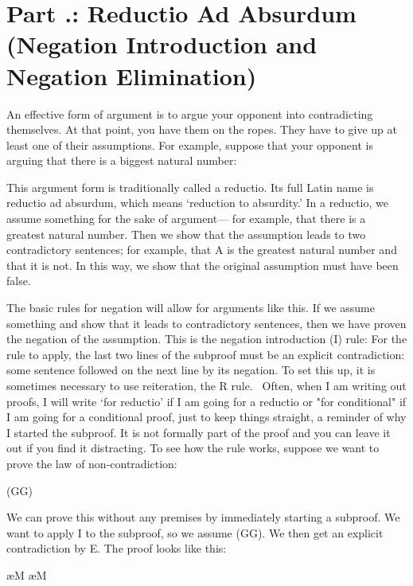\section{Part \thechapcount.\theseccount: Reductio Ad Absurdum (Negation Introduction and Negation Elimination)}
An effective form of argument is to argue your opponent into contradicting themselves. At that point, you have them on the ropes. They have to give up at least one of their assumptions. For example, suppose that your opponent is arguing that there is a biggest natural number:

This argument form is traditionally called a reductio. Its full Latin name is reductio ad absurdum, which means ‘reduction to absurdity.’ In a reductio, we assume something for the sake of argument— for example, that there is a greatest natural number. Then we show that the assumption leads to two contradictory sentences; for example, that A is the greatest natural number and that it is not. In this way, we show that the original assumption must have been false.

The basic rules for negation will allow for arguments like this. If we assume something and show that it leads to contradictory sentences, then we have proven the negation of the assumption. This is the negation introduction (\enot I) rule:
For the rule to apply, the last two lines of the subproof must be an explicit contradiction: some sentence followed on the next line by its negation. To set this up, it is sometimes necessary to use reiteration, the R rule.  Often, when I am writing out proofs, I will write ‘for reductio’ if I am going for a reductio or "for conditional" if I am going for a conditional proof, just to keep things straight, a reminder of why I started the subproof. It is not formally part of the proof and you can leave it out if you find it distracting. To see how the rule works, suppose we want to prove the law of non-contradiction:
\begin{center}
\enot (G\eand \enot G)
\end{center}
We can prove this without any premises by immediately starting a subproof. We want to apply \enot I to the subproof, so we assume (G\eand \enot G). We then get an explicit contradiction by \eand E. The proof looks like this:
\begin{fitchproof}
\open
	 \ae{M}
	 \ae{M}
\close
{} 
\end{fitchproof}

